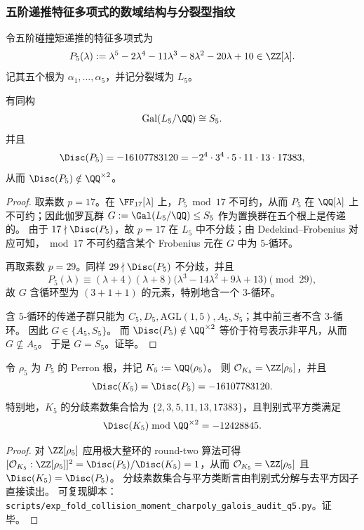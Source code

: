 \subsubsection{五阶递推特征多项式的数域结构与分裂型指纹}\label{subsec:pom-s5-galois-arithmetic}

令五阶碰撞矩递推的特征多项式为
\[
P_5(\lambda)
:=\lambda^5-2\lambda^4-11\lambda^3-8\lambda^2-20\lambda+10\in\ZZ[\lambda].
\]
记其五个根为 \(\alpha_1,\dots,\alpha_5\)，并记分裂域为 \(L_5\)。

\begin{proposition}[五阶特征多项式的满对称伽罗瓦群]\label{prop:pom-s5-galois-s5}
有同构
\[
\mathrm{Gal}(L_5/\QQ)\cong S_5.
\]
并且
\[
\Disc(P_5)=-16107783120=-2^{4}\cdot 3^{4}\cdot 5\cdot 11\cdot 13\cdot 17383,
\]
从而 \(\Disc(P_5)\notin \QQ^{\times 2}\)。
\end{proposition}
\begin{proof}
取素数 \(p=17\)。在 \(\FF_{17}[\lambda]\) 上，\(P_5\bmod 17\) 不可约，从而 \(P_5\) 在 \(\QQ[\lambda]\) 上不可约；因此伽罗瓦群 \(G:=\Gal(L_5/\QQ)\le S_5\) 作为置换群在五个根上是传递的。
由于 \(17\nmid \Disc(P_5)\)，故 \(p=17\) 在 \(L_5\) 中不分歧；由 Dedekind--Frobenius 对应可知，\(\bmod 17\) 不可约蕴含某个 Frobenius 元在 \(G\) 中为 \(5\)-循环。
\par
再取素数 \(p=29\)。同样 \(29\nmid \Disc(P_5)\) 不分歧，并且
\[
P_5(\lambda)\equiv (\lambda+4)(\lambda+8)\bigl(\lambda^3-14\lambda^2+9\lambda+13\bigr)\pmod{29},
\]
故 \(G\) 含循环型为 \((3+1+1)\) 的元素，特别地含一个 \(3\)-循环。
\par
含 \(5\)-循环的传递子群只能为 \(C_5,D_5,\mathrm{AGL}(1,5),A_5,S_5\)；其中前三者不含 \(3\)-循环。
因此 \(G\in\{A_5,S_5\}\)。
而 \(\Disc(P_5)\notin\QQ^{\times2}\) 等价于符号表示非平凡，从而 \(G\not\subseteq A_5\)。
于是 \(G=S_5\)。证毕。
\end{proof}

\begin{proposition}\label{prop:pom-s5-field-discriminant-monogenic}
令 \(\rho_5\) 为 \(P_5\) 的 Perron 根，并记
\(
K_5:=\QQ(\rho_5)
\)。
则 \(\mathcal O_{K_5}=\ZZ[\rho_5]\)，并且
\[
\Disc(K_5)=\Disc(P_5)=-16107783120.
\]
特别地，\(K_5\) 的分歧素数集合恰为 \(\{2,3,5,11,13,17383\}\)，且判别式平方类满足
\[
\Disc(K_5)\bmod \QQ^{\times 2}=-12428845.
\]
\end{proposition}
\begin{proof}
对 \(\ZZ[\rho_5]\) 应用极大整环的 round-two 算法可得 \([\mathcal O_{K_5}:\ZZ[\rho_5]]^2=\Disc(P_5)/\Disc(K_5)=1\)，从而 \(\mathcal O_{K_5}=\ZZ[\rho_5]\) 且 \(\Disc(K_5)=\Disc(P_5)\)。
分歧素数集合与平方类断言由判别式分解与去平方因子直接读出。
可复现脚本：\texttt{scripts/exp\_fold\_collision\_moment\_charpoly\_galois\_audit\_q5.py}。证毕。
\end{proof}

